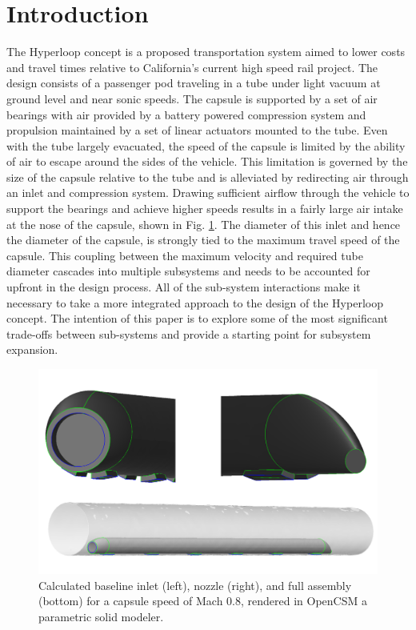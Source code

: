\documentclass[heading.tex]{subfiles}
\begin{document}
\section{Introduction}


The Hyperloop concept is a proposed transportation system aimed to lower costs and travel times relative to California's current high speed
 rail project. \cite{Musk} The design consists of a passenger pod traveling in a tube under light vacuum at ground level and near sonic
speeds. The capsule is supported by a set of air bearings with air provided by a battery powered compression system and propulsion maintained
by a set of linear actuators mounted to the tube. Even with the tube largely evacuated, the speed of the capsule is limited by the ability of air to
escape around the sides of the vehicle. This limitation is governed by the size of the capsule relative to the tube and is alleviated by redirecting air
through an inlet and compression system. Drawing sufficient airflow through the vehicle to support the bearings and achieve higher speeds results
in a fairly large air intake at the nose of the capsule, shown in Fig. \ref{f:hyperloopCAD}. The diameter of this inlet and hence the diameter of the
capsule, is strongly tied to the maximum travel speed of the capsule. This coupling between the maximum velocity and
required tube diameter cascades into multiple subsystems and needs to be accounted for upfront in the design process. 
All of the sub-system interactions make it necessary to take a more integrated approach to the design of the Hyperloop concept. The intention of
this paper is to explore some of the most significant trade-offs between sub-systems and provide a starting point for subsystem expansion.

\begin{figure}[hbtp]
\centering
\includegraphics[width=\textwidth]{images/hyperloop_cad.png}
\caption{Calculated baseline inlet (left), nozzle (right), and full assembly (bottom) for a capsule speed of Mach 0.8, rendered in OpenCSM a parametric solid modeler.}
\label{f:hyperloopCAD}
\end{figure}
\end{document}
